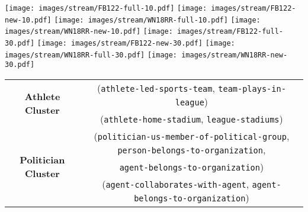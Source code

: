 \documentclass[11pt,a4paper]{article}
\newcommand{\nell}{NELL-995\xspace}
\begin{document}
\begin{figure*}
    \centering
    \texttt{[image: images/stream/FB122-full-10.pdf]}
    \texttt{[image: images/stream/FB122-new-10.pdf]}
    \texttt{[image: images/stream/WN18RR-full-10.pdf]}
    \texttt{[image: images/stream/WN18RR-new-10.pdf]}
    \texttt{[image: images/stream/FB122-full-30.pdf]}
    \texttt{[image: images/stream/FB122-new-30.pdf]}
    \texttt{[image: images/stream/WN18RR-full-30.pdf]}
    \texttt{[image: images/stream/WN18RR-new-30.pdf]}
    \caption{Results for open-world setting when trained with 10\% (top row) and 30\% (bottom row) of already seen edges. Our online method matches the offline version of our approach and outperforms the online variants of RotatE. After all data is observed our online method achieves results closest to the best offline method's results.}
    \label{fig:streaming}
\end{figure*}

\begin{table*}
    \centering
    \small
    \begin{tabular}{c c}
    \toprule
      \multirow{2}{*}{\bf Athlete Cluster}  & (\texttt{athlete-led-sports-team}, \texttt{team-plays-in-league})\\
         & (\texttt{athlete-home-stadium}, \texttt{league-stadiums})\\\midrule
        \multirow{3}{*}{\bf Politician Cluster}  & (\texttt{politician-us-member-of-political-group}, \texttt{person-belongs-to-organization}, \\
        & \texttt{agent-belongs-to-organization}) \\
         & (\texttt{agent-collaborates-with-agent}, \texttt{agent-belongs-to-organization})\\\bottomrule
    \end{tabular}
    \caption{High scoring paths in different clusters for the query \texttt{agent-belongs-to-organization} in \nell}
    \label{tab:nell_eye_candy}
\end{table*}
\end{document}
